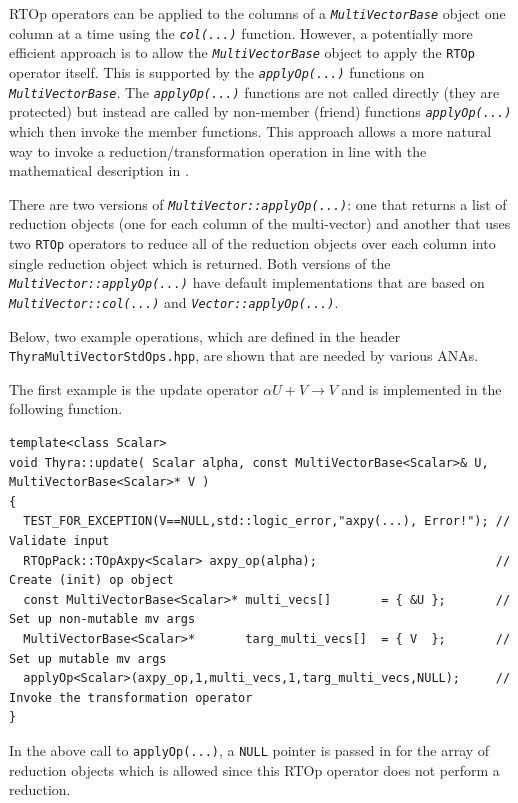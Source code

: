 \documentclass[pdf,ps2pdf,11pt]{SANDreport}
\begin{document}
RTOp operators can be applied to the columns of a
{}\texttt{\textit{Multi\-Vector\-Base}} object one column at a time using
the {}\texttt{\textit{col(...)}} function.  However, a potentially more
efficient approach is to allow the {}\texttt{\textit{Multi\-Vector\-Base}}
object to apply the {}\texttt{RTOp} operator itself.  This is
supported by the {}\texttt{\textit{applyOp(\-...)}} functions on
{}\texttt{\textit{Multi\-Vector\-Base}}.  The
{}\texttt{\textit{applyOp(\-...)}} functions are not called directly
(they are protected) but instead are called by non-member (friend)
functions {}\texttt{\textit{applyOp(\-...)}} which then invoke the
member functions.  This approach allows a more natural way to invoke a
reduction/transformation operation in line with the mathematical
description in {}\cite{ref:rtop_toms}.

There are two versions of
{}\texttt{\textit{Multi\-Vector\-::applyOp(\-...)}}: one that returns
a list of reduction objects (one for each column of the multi-vector)
and another that uses two {}\texttt{RTOp} operators to reduce all of
the reduction objects over each column into single reduction object
which is returned.  Both versions of the
{}\texttt{\textit{Multi\-Vector\-::applyOp(\-...)}} have default
implementations that are based on
{}\texttt{\textit{Multi\-Vector\-::col(...)}} and
{}\texttt{\textit{Vector\-::applyOp(\-...)}}.

Below, two example operations, which are defined in the header
{}\texttt{Thyra\-Multi\-Vector\-Std\-Ops.hpp}, are shown that are
needed by various ANAs.

The first example is the update operator $\alpha U + V \rightarrow V$
and is implemented in the following function.

{\scriptsize\begin{verbatim}
template<class Scalar>
void Thyra::update( Scalar alpha, const MultiVectorBase<Scalar>& U, MultiVectorBase<Scalar>* V )
{
  TEST_FOR_EXCEPTION(V==NULL,std::logic_error,"axpy(...), Error!"); // Validate input
  RTOpPack::TOpAxpy<Scalar> axpy_op(alpha);                         // Create (init) op object
  const MultiVectorBase<Scalar>* multi_vecs[]       = { &U };       // Set up non-mutable mv args
  MultiVectorBase<Scalar>*       targ_multi_vecs[]  = { V  };       // Set up mutable mv args
  applyOp<Scalar>(axpy_op,1,multi_vecs,1,targ_multi_vecs,NULL);     // Invoke the transformation operator
}
\end{verbatim}}

{}\noindent{}In the above call to {}\texttt{applyOp(\-...)}, a
{}\texttt{NULL} pointer is passed in for the array of reduction
objects which is allowed since this RTOp operator does not perform a
reduction.
\end{document}
